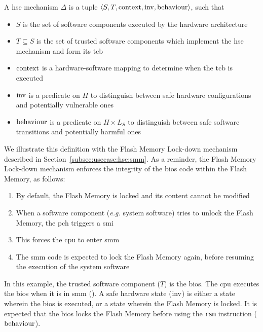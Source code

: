 \begin{definition}
  \label{def:speccert:hse}
  A \ac{hse} mechanism $\Delta$ is a tuple
  $\langle S, T, \mathrm{context}, \mathrm{inv}, \mathrm{behaviour} \rangle$, such
  that
  \begin{itemize}
  \item $S$ is the set of software components executed by the hardware
    architecture
  \item $T \subseteq S$ is the set of trusted software components which
    implement the \ac{hse} mechanism and form its \ac{tcb}
  \item $\mathrm{context}$ is a hardware-software mapping to determine when the
    \ac{tcb} is executed
  \item $\mathrm{inv}$ is a predicate on $H$ to distinguish between safe hardware
    configurations and potentially vulnerable ones
  \item $\mathrm{behaviour}$ is a predicate on $H \times L_S$ to distinguish
    between safe software transitions and potentially harmful ones
  \end{itemize}
\end{definition}

We illustrate this definition with the Flash Memory Lock-down mechanism
described in Section~\ref{subsec:usecase:hse:smm}.
%
As a reminder, the Flash Memory Lock-down mechanism enforces the integrity of
the \ac{bios} code within the Flash Memory, as follows:
%
\begin{enumerate}
\item By default, the Flash Memory is locked and its content cannot be modified
%
\item When a software component (\emph{e.g.} system software) tries to unlock
  the Flash Memory, the \ac{pch} triggers a \ac{smi}
%
\item This forces the \ac{cpu} to enter \ac{smm}
%
\item The \ac{smm} code is expected to lock the Flash Memory again, before
  resuming the execution of the system software
\end{enumerate}

\begin{example}
  \label{example:speccert:flashdef}
  In this example, the trusted software component ($T$) is the \ac{bios}.
  The \ac{cpu} executes the \ac{bios} when it is in \ac{smm} ().
  A safe hardware state ($\mathrm{inv}$) is either a state wherein the \ac{bios}
  is executed, or a state wherein the Flash Memory is locked.
  It is expected that the \ac{bios} locks the Flash Memory before using the
  \texttt{rsm} instruction ($\mathrm{behaviour}$).
\end{example}

